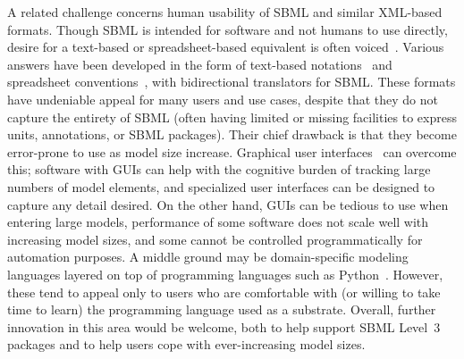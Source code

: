 \documentclass{sbml-paper}
\begin{document}
A related challenge concerns human usability of SBML and similar XML-based formats.  Though SBML is intended for software and not humans to use directly, desire for a text-based or spreadsheet-based equivalent is often voiced~\citep[e.g.,][]{Kirouac2019reproducibility}.  Various answers have been developed in the form of text-based notations~\citep[e.g.,][]{Gillespie2006tools, Smith2009antimony, Shapiro2016pycellerator} and spreadsheet conventions~\citep[e.g.,][]{Lubitz2016sbtab, ganter2013metanetx, Osorio2017minval}, with bidirectional translators for SBML.  These formats have undeniable appeal for many users and use cases, despite that they do not capture the entirety of SBML (often having limited or missing facilities to express units, annotations, or SBML packages).  Their chief drawback is that they become error-prone to use as model size increase.  Graphical user interfaces~\citep[GUIs; e.g.,][]{Funahashi2003celldesignera, hoops2006copasi, Moraru2008virtual} can overcome this; software with GUIs can help with the cognitive burden of tracking large numbers of model elements, and specialized user interfaces can be designed to capture any detail desired.  On the other hand, GUIs can be tedious to use when entering large models, performance of some software does not scale well with increasing model sizes, and some cannot be controlled programmatically for automation purposes.  A middle ground may be domain-specific modeling languages layered on top of programming languages such as Python~\citep[e.g.,][]{Choi2018tellurium, olivier2005modelling, Lopez2013programming}.  However, these tend to appeal only to users who are comfortable with (or willing to take time to learn) the programming language used as a substrate.  Overall, further innovation in this area would be welcome, both to help support SBML Level~3 packages and to help users cope with ever-increasing model sizes.
\end{document}
